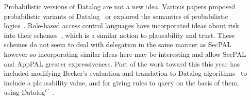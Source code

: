 \documentclass[a4paper]{scrartcl}
\begin{document}
Probabilistic versions of Datalog are not a new idea.  Various papers proposed
probabilistic variants of Datalog~\cite{fuhr_probabilistic_1995} or explored the
semantics of probabilistic logics~\cite{halpern_analysis_1990}.  Role-based
access control languages have incorporated ideas about risk into their
schemes~\cite{josang_analysing_2004,dimmock_using_2004,salim_approach_2011},
which is a similar notion to plausability and trust.  These schemes do not seem
to deal with delegation in the same manner as SecPAL however so incorporating
similar ideas here may be interesting and allow SecPAL and AppPAL greater
expressiveness.  Part of the work toward this this year has included modifying Becker's
evaluation and translation-to-Datalog algorithms~\cite{becker_secpal:_2010} to
include a plausability value, and for giving rules to query on the basis of
them, using Datalog$^C$~\cite{li_datalog_2003}.


\end{document}
